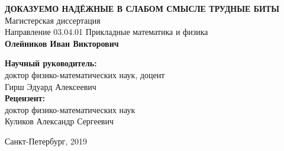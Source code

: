 \begin{titlepage}

\begin{center}
\end{center}

\vspace{2cm}
\begin{center}
  \MakeUppercase{\textbf{Доказуемо надёжные в слабом смысле трудные биты}}
  \\
  Магистерская диссертация
  \\[1cm]
  Направление 03.04.01 Прикладные математика и физика
  \\[1cm]
  {\fontsize{18}{21.6}\selectfont
    \textbf{Олейников Иван Викторович}
  }
  \\[2cm]
\end{center}

\hfill
\begin{minipage}{0.6\textwidth}
\textbf{Научный руководитель:} \\
доктор физико-математических наук, доцент \\
Гирш Эдуард Алексеевич \\[0.5cm]
\textbf{Рецензент:} \\
доктор физико-математических наук \\
Куликов Александр Сергеевич
\end{minipage}

\begin{center}
\mbox{}
\vfill
Санкт-Петербург, 2019
\end{center}

\end{titlepage}
\newpage
